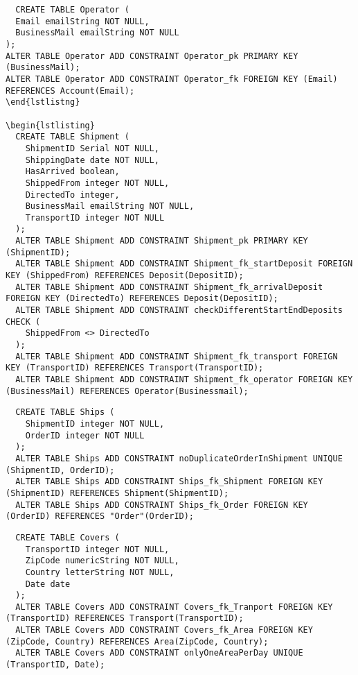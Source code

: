 \begin{lstlisting}
  CREATE TABLE Operator (
  Email emailString NOT NULL,
  BusinessMail emailString NOT NULL
);
ALTER TABLE Operator ADD CONSTRAINT Operator_pk PRIMARY KEY (BusinessMail);
ALTER TABLE Operator ADD CONSTRAINT Operator_fk FOREIGN KEY (Email) REFERENCES Account(Email);
\end{lstlistng}

\begin{lstlisting}
  CREATE TABLE Shipment (
    ShipmentID Serial NOT NULL,
    ShippingDate date NOT NULL,
    HasArrived boolean,
    ShippedFrom integer NOT NULL,
    DirectedTo integer,
    BusinessMail emailString NOT NULL,
    TransportID integer NOT NULL
  );
  ALTER TABLE Shipment ADD CONSTRAINT Shipment_pk PRIMARY KEY (ShipmentID);
  ALTER TABLE Shipment ADD CONSTRAINT Shipment_fk_startDeposit FOREIGN KEY (ShippedFrom) REFERENCES Deposit(DepositID);
  ALTER TABLE Shipment ADD CONSTRAINT Shipment_fk_arrivalDeposit FOREIGN KEY (DirectedTo) REFERENCES Deposit(DepositID);
  ALTER TABLE Shipment ADD CONSTRAINT checkDifferentStartEndDeposits CHECK (
    ShippedFrom <> DirectedTo
  );
  ALTER TABLE Shipment ADD CONSTRAINT Shipment_fk_transport FOREIGN KEY (TransportID) REFERENCES Transport(TransportID);
  ALTER TABLE Shipment ADD CONSTRAINT Shipment_fk_operator FOREIGN KEY (BusinessMail) REFERENCES Operator(Businessmail);
\end{lstlisting}

\begin{lstlisting}
  CREATE TABLE Ships ( 
    ShipmentID integer NOT NULL,
    OrderID integer NOT NULL
  );
  ALTER TABLE Ships ADD CONSTRAINT noDuplicateOrderInShipment UNIQUE (ShipmentID, OrderID);
  ALTER TABLE Ships ADD CONSTRAINT Ships_fk_Shipment FOREIGN KEY (ShipmentID) REFERENCES Shipment(ShipmentID);
  ALTER TABLE Ships ADD CONSTRAINT Ships_fk_Order FOREIGN KEY (OrderID) REFERENCES "Order"(OrderID);
\end{lstlisting}

\begin{lstlisting}
  CREATE TABLE Covers (
    TransportID integer NOT NULL,
    ZipCode numericString NOT NULL,
    Country letterString NOT NULL,
    Date date
  );
  ALTER TABLE Covers ADD CONSTRAINT Covers_fk_Tranport FOREIGN KEY (TransportID) REFERENCES Transport(TransportID);
  ALTER TABLE Covers ADD CONSTRAINT Covers_fk_Area FOREIGN KEY (ZipCode, Country) REFERENCES Area(ZipCode, Country);
  ALTER TABLE Covers ADD CONSTRAINT onlyOneAreaPerDay UNIQUE (TransportID, Date);
\end{lstlisting}

